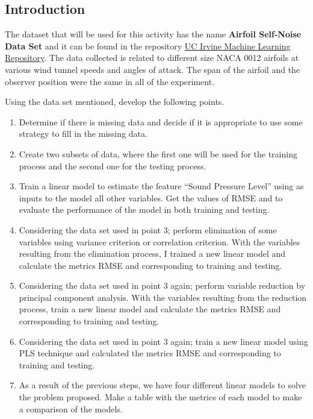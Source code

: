 \documentclass[
  letterpaper,
  DIV=11,
  numbers=noendperiod]{scrartcl}
\providecommand{\tightlist}{%
  \setlength{\itemsep}{0pt}\setlength{\parskip}{0pt}}\usepackage{longtable,booktabs,array}
\begin{document}
\hypertarget{introduction}{%
\subsection{Introduction}\label{introduction}}

The dataset that will be used for this activity has the name
\textbf{Airfoil Self-Noise Data Set} and it can be found in the
repository
\href{https://archive.ics.uci.edu/ml/datasets/Airfoil+Self-Noise}{UC
Irvine Machine Learning Repository}. The data collected is related to
different size NACA 0012 airfoils at various wind tunnel speeds and
angles of attack. The span of the airfoil and the observer position were
the same in all of the experiment.

Using the data set mentioned, develop the following points.

\begin{enumerate}
\def\labelenumi{\arabic{enumi}.}
\tightlist
\item
  Determine if there is missing data and decide if it is appropriate to
  use some strategy to fill in the missing data.
\item
  Create two subsets of data, where the first one will be used for the
  training process and the second one for the testing process.
\item
  Train a linear model to estimate the feature ``Sound Pressure Level''
  using as inputs to the model all other variables. Get the values of
  RMSE and to evaluate the performance of the model in both training and
  testing.
\item
  Considering the data set used in point 3; perform elimination of some
  variables using variance criterion or correlation criterion. With the
  variables resulting from the elimination process, I trained a new
  linear model and calculate the metrics RMSE and corresponding to
  training and testing.
\item
  Considering the data set used in point 3 again; perform variable
  reduction by principal component analysis. With the variables
  resulting from the reduction process, train a new linear model and
  calculate the metrics RMSE and corresponding to training and testing.
\item
  Considering the data set used in point 3 again; train a new linear
  model using PLS technique and calculated the metrics RMSE and
  corresponding to training and testing.
\item
  As a result of the previous steps, we have four different linear
  models to solve the problem proposed. Make a table with the metrics of
  each model to make a comparison of the models.
\end{enumerate}
\end{document}
